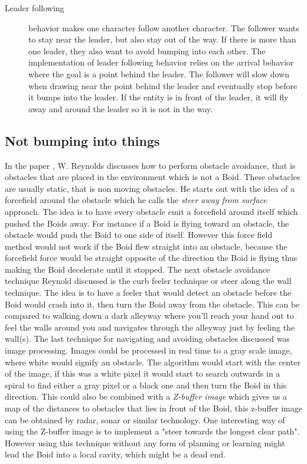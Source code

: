 \begin{description}
\item [Leader following] behavior makes one character follow another character. The follower wants to stay near the leader, but also stay out of the way. If there is more than one leader, they also want to avoid bumping into each other. The implementation of leader following behavior relies on the arrival behavior where the goal is a point behind the leader. The follower will slow down when drawing near the point behind the leader and eventually stop before it bumps into the leader. If the entity is in front of the leader, it will fly away and around the leader so it is not in the way.
\end{description}

\subsection{Not bumping into things}
In the paper \citep{CraigW.Reynolds}, W. Reynolds discusses how to perform obstacle avoidance, that is obstacles that are placed in the environment which is not a Boid. These obstacles are usually static, that is non moving obstacles. He starts out with the idea of a forcefield around the obstacle which he calls the \textit{steer away from surface} approach. The idea is to have every obstacle emit a forcefield around itself which pushed the Boids away. For instance if a Boid is flying toward an obstacle, the obstacle would push the Boid to one side of itself. However this force field method would not work if the Boid flew straight into an obstacle, because the forcefield force would be straight opposite of the direction the Boid is flying thus making the Boid decelerate until it stopped.
The next obstacle avoidance technique Reynold discussed is the curb feeler technique or steer along the wall technique. The idea is to have a feeler that would detect an obstacle before the Boid would crash into it, then turn the Boid away from the obstacle. This can be compared to walking down a dark alleyway where you'll reach your hand out to feel the walls around you and navigates through the alleyway just by feeling the wall(s).
The last technique for navigating and avoiding obstacles discussed was image processing. Images could be processed in real time to a gray scale image, where white would signify an obstacle. The algorithm would start with the center of the image, if this was a white pixel it would start to search outwards in a spiral to find either a gray pixel or a black one and then turn the Boid in this direction. This could also be combined with a \textit{Z-buffer image} which gives us a map of the distances to obstacles that lies in front of the Boid, this z-buffer image can be obtained by radar, sonar or similar technology. One interesting way of using the Z-buffer image is to implement a "steer towards the longest clear path". However using this technique without any form of planning or learning might lead the Boid into a local cavity, which might be a dead end.

